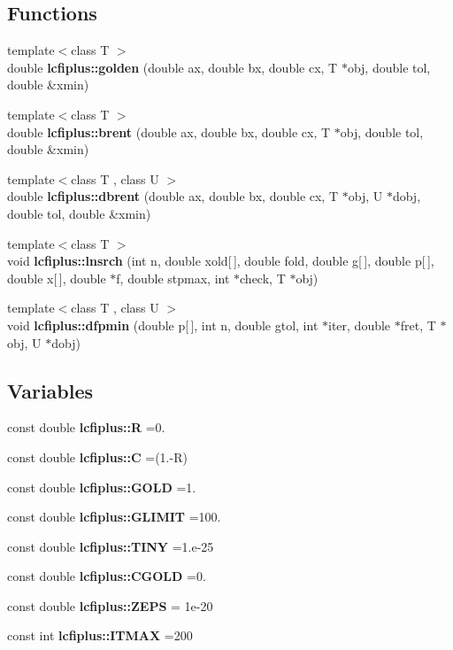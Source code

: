 \subsection*{Functions}
\begin{DoxyCompactItemize}
\item 
{\footnotesize template$<$class T $>$ }\\double \textbf{ lcfiplus\+::golden} (double ax, double bx, double cx, T $\ast$obj, double tol, double \&xmin)
\item 
{\footnotesize template$<$class T $>$ }\\double \textbf{ lcfiplus\+::brent} (double ax, double bx, double cx, T $\ast$obj, double tol, double \&xmin)
\item 
{\footnotesize template$<$class T , class U $>$ }\\double \textbf{ lcfiplus\+::dbrent} (double ax, double bx, double cx, T $\ast$obj, U $\ast$dobj, double tol, double \&xmin)
\item 
{\footnotesize template$<$class T $>$ }\\void \textbf{ lcfiplus\+::lnsrch} (int n, double xold[$\,$], double fold, double g[$\,$], double p[$\,$], double x[$\,$], double $\ast$f, double stpmax, int $\ast$check, T $\ast$obj)
\item 
{\footnotesize template$<$class T , class U $>$ }\\void \textbf{ lcfiplus\+::dfpmin} (double p[$\,$], int n, double gtol, int $\ast$iter, double $\ast$fret, T $\ast$obj, U $\ast$dobj)
\end{DoxyCompactItemize}
\subsection*{Variables}
\begin{DoxyCompactItemize}
\item 
const double \textbf{ lcfiplus\+::R} =0.
\item 
const double \textbf{ lcfiplus\+::C} =(1.-\/R)
\item 
const double \textbf{ lcfiplus\+::\+G\+O\+LD} =1.
\item 
const double \textbf{ lcfiplus\+::\+G\+L\+I\+M\+IT} =100.
\item 
const double \textbf{ lcfiplus\+::\+T\+I\+NY} =1.e-\/25
\item 
const double \textbf{ lcfiplus\+::\+C\+G\+O\+LD} =0.
\item 
const double \textbf{ lcfiplus\+::\+Z\+E\+PS} = 1e-\/20
\item 
const int \textbf{ lcfiplus\+::\+I\+T\+M\+AX} =200
\end{DoxyCompactItemize}


